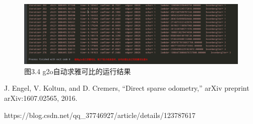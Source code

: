 \documentclass[40pt,a4paper，UTF8]{ctexart}
\numberwithin{equation}{section}
\begin{document}
\begin{figure}[H]
\centering
\includegraphics[width=4.8in]{ch7_3_4.png} {图3.4 g2o自动求雅可比的运行结果}
\end{figure}


\begin{thebibliography}{99}  
J. Engel, V. Koltun, and D. Cremers, “Direct sparse odometry,” arXiv preprint arXiv:1607.02565,
2016.

https://blog.csdn.net/qq\_37746927/article/details/123787617
\end{thebibliography}
\end{document}
